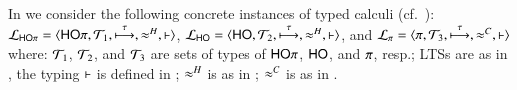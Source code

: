 \smallskip

In  %
we consider the following concrete instances of typed calculi (cf.~):
\\
%
	$\mathcal{L}_{\mathsf{HO}\pi}=\langle \mathsf{HO}\pi, {\cal{T}}_1, \stackrel{\tau}{\longmapsto}, \approx^H, \vdash \rangle$,
	$\mathcal{L}_{\mathsf{HO}}=\langle \mathsf{HO}, {\cal{T}}_2, \stackrel{\tau}{\longmapsto}, \approx^H, \vdash \rangle$, and
	$\mathcal{L}_{\pi}=\langle \pi, {\cal{T}}_3, \stackrel{\tau}{\longmapsto}, \approx^C, \vdash \rangle$ 
%
where: 
${\cal{T}}_1$, ${\cal{T}}_2$, 
and ${\cal{T}}_3$
are sets of types of $\mathsf{HO}\pi$, $\mathsf{HO}$, and $\pi$, resp.;
LTSs are as in , 
the typing $\vdash$ is defined in 
;  
$\approx^H$ is as in ; 
$\approx^C$ is as in .


